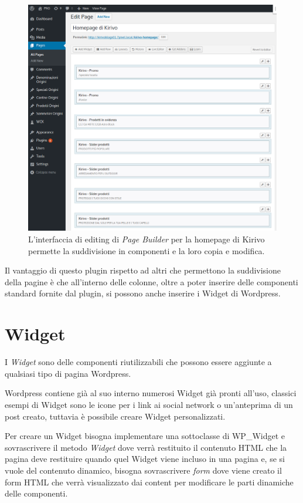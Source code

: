 \begin{figure}
  \includegraphics[width=\textwidth]{figure/pagebuilder.png}
  \caption{L'interfaccia di editing di \emph{Page Builder} per la homepage di Kirivo permette
  la suddivisione in componenti e la loro copia e modifica.}
  \label{fig:wsource}
\end{figure}


Il vantaggio di questo plugin rispetto ad altri che permettono la suddivisione della pagine è che all'interno delle colonne,
oltre a poter inserire delle componenti standard fornite dal plugin, si possono anche inserire i Widget di Wordpress.

\section{Widget}
I \emph{Widget} sono delle componenti riutilizzabili che possono essere aggiunte a qualsiasi
tipo di pagina Wordpress. 

Wordpress contiene già al suo interno numerosi Widget già pronti all'uso, classici esempi di Widget sono le icone per i link ai social network o un'anteprima di un post creato, tuttavia è possibile creare Widget
personalizzati.

Per creare un Widget bisogna implementare una sottoclasse di WP\_Widget\cite{WPWID}
e sovrascrivere il metodo \emph{Widget} dove verrà restituito il contenuto HTML che la pagina deve restituire quando quel Widget viene incluso in una pagina
e, se si vuole del contenuto dinamico, bisogna sovrascrivere \emph{form} dove viene creato il form HTML che verrà visualizzato dai content per modificare le
parti dinamiche delle componenti.


